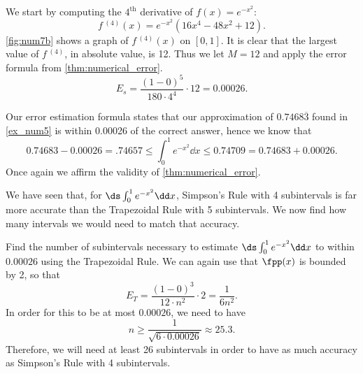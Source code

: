\begin{example}
We start by computing the $4^\text{th}$ derivative of $f(x) = e^{-x^2}$:
%
%
\[f\,^{(4)}(x) = e^{-x^2}(16x^4-48x^2+12).\]
\autoref{fig:num7b} shows a graph of $f\,^{(4)}(x)$ on $[0,1]$. It is clear that the largest value of $f\,^{(4)}$, in absolute value, is 12. Thus we let $M=12$ and apply the error formula from \autoref{thm:numerical_error}.
\[E_s = \frac{(1-0)^5}{180\cdot 4^4}\cdot 12 = 0.00026.\]

Our error estimation formula states that our approximation of $0.7468\overline{3}$ found in \autoref{ex_num5} is within 0.00026 of the correct answer, hence we know that
\[0.74683-0.00026 = .74657 \leq \int_0^1e^{-x^2}\dd x \leq 0.74709 = 0.74683 + 0.00026.\]
Once again we affirm the validity of \autoref{thm:numerical_error}.
\end{example}

We have seen that, for $\ds\int_0^1 e^{-x^2}\dd x$, Simpson's Rule with 4 subintervals is far more accurate than the Trapezoidal Rule with 5 subintervals.  We now find how many intervals we would need to match that accuracy.

\begin{example}\label{ex_num_find_num_sub_int}%
Find the number of subintervals necessary to estimate $\ds\int_0^1 e^{-x^2}\dd x$ to within $0.00026$ using the Trapezoidal Rule.
\solution
We can again use that $\fpp(x)$ is bounded by 2, so that
\[E_T=\frac{(1-0)^3}{12\cdot n^2}\cdot 2=\frac1{6n^2}.\]
In order for this to be at most $0.00026$, we need to have
\[n\ge\frac1{\sqrt{6\cdot0.00026}}\approx25.3.\]
Therefore, we will need at least 26 subintervals in order to have as much accuracy as Simpson's Rule with 4 subintervals.
\end{example}

